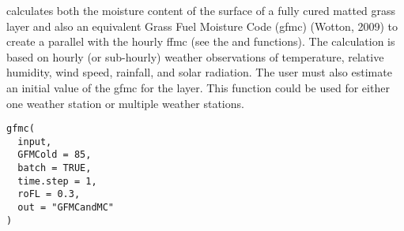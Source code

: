 \documentclass[a4paper]{book}
\begin{document}
%
\begin{Description}\relax
{} calculates both the moisture content of the surface of a fully
cured matted grass layer and also an equivalent Grass Fuel Moisture Code
(gfmc) (Wotton, 2009) to create a parallel with the hourly ffmc (see the
 and functions). The calculation is
based on hourly (or sub-hourly) weather observations of temperature,
relative humidity, wind speed, rainfall, and solar radiation. The user must
also estimate an initial value of the gfmc for the layer. This function
could be used for either one weather station or multiple weather stations.
\end{Description}
%
\begin{Usage}
\begin{verbatim}
gfmc(
  input,
  GFMCold = 85,
  batch = TRUE,
  time.step = 1,
  roFL = 0.3,
  out = "GFMCandMC"
)
\end{verbatim}
\end{Usage}
%
\end{document}
